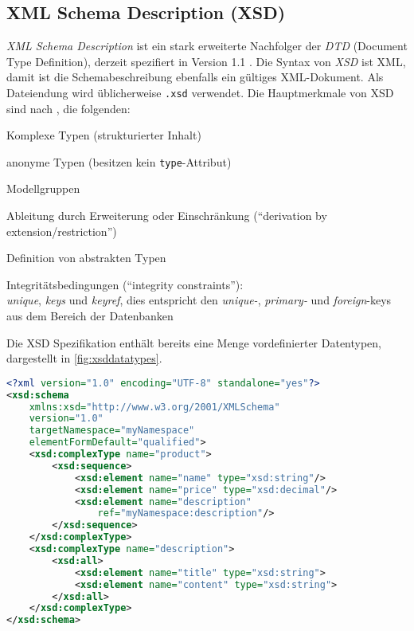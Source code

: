 \subsection{XML Schema Description (XSD)}
\label{sec:xsd}

\emph{XML Schema Description} ist ein stark erweiterte Nachfolger der \emph{DTD} (Document Type Definition), derzeit spezifiert in Version 1.1 \cite{XMLSchema11Specification}. 
Die Syntax von \emph{XSD} ist XML, damit ist die Schemabeschreibung ebenfalls ein gültiges XML-Dokument. Als Dateiendung wird üblicherweise \texttt{.xsd} verwendet.
Die Hauptmerkmale von XSD sind nach \cite{taxonomyXMLSchema} %
, die folgenden:
\begin{compactitem}
    \item Komplexe Typen (strukturierter Inhalt)
    \item anonyme Typen (besitzen kein \texttt{type}-Attribut)
    \item Modellgruppen
    \item Ableitung durch Erweiterung oder Einschränkung (\enquote{derivation by extension/restriction})
    \item Definition von abstrakten Typen
    \item Integritätsbedingungen (\enquote{integrity constraints}):\\
        \emph{unique}, \emph{keys} und \emph{keyref}, dies entspricht den \emph{unique-}, \emph{primary-} und \emph{foreign}-keys aus dem Bereich der Datenbanken
\end{compactitem}

Die XSD Spezifikation enthält bereits eine Menge vordefinierter Datentypen, dargestellt in \cref{fig:xsddatatypes}.

\begin{lstlisting}[language=XML, caption=Minimalbeispiel für eine Schemabeschreibung mit XSD, label=lst:minimalXSD]
<?xml version="1.0" encoding="UTF-8" standalone="yes"?>
<xsd:schema 
    xmlns:xsd="http://www.w3.org/2001/XMLSchema"
    version="1.0" 
    targetNamespace="myNamespace" 
    elementFormDefault="qualified">
    <xsd:complexType name="product">
        <xsd:sequence>
            <xsd:element name="name" type="xsd:string"/>
            <xsd:element name="price" type="xsd:decimal"/>
            <xsd:element name="description"
                ref="myNamespace:description"/>
        </xsd:sequence>
    </xsd:complexType>
    <xsd:complexType name="description">
        <xsd:all>
            <xsd:element name="title" type="xsd:string">
            <xsd:element name="content" type="xsd:string">
        </xsd:all>
    </xsd:complexType>
</xsd:schema>
\end{lstlisting}

